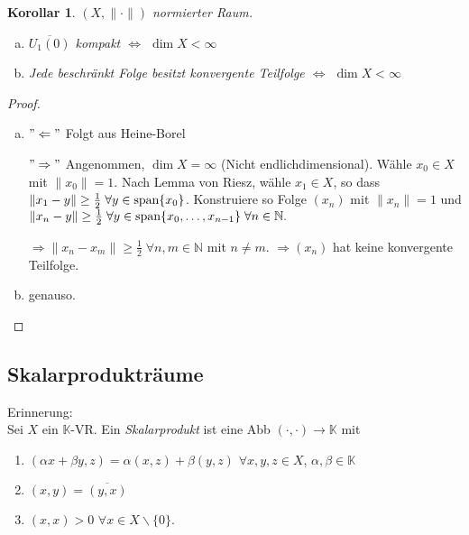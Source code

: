 \documentclass[ngerman]{report}
\theoremstyle{plain}%
\newtheorem{cor}[thm]{Korollar}
\theoremstyle{definition}%
\theoremstyle{myStyle}
\newcommand{\N}{\mathbb{N}}
\newcommand{\K}{\mathbb{K}}
\newcommand{\aufspan}{\textnormal{span}}
\newcommand{\norm}[1]{\|#1\|}
\newcommand{\df}[1][]{%
	\overset{#1}{\Rightarrow}
}
\newcommand{\aq}{\Leftrightarrow} %
\newcommand{\ov}[1]{\overline{#1}}
\begin{document}
	\begin{cor}
		$(X,\norm{\cdot})$ normierter Raum.
			\begin{enumerate}[a)] 
				\item $\overline{U_1(0)}$ kompakt $\aq$ $\dim X < \infty$
				\item Jede beschränkt Folge besitzt konvergente Teilfolge $\aq$ $\dim X < \infty$
			\end{enumerate}
	\end{cor}

	\begin{proof}
		 \begin{enumerate}[a)]
			 \item $"\Leftarrow"$ Folgt aus Heine-Borel\par
				$"\Rightarrow"$ Angenommen, $\dim X = \infty$ (Nicht endlichdimensional). 
				Wähle $x_0 \in X$ mit $\norm{x_0} = 1$. Nach Lemma von Riesz, wähle $x_1 \in X$, so dass 
				$\norm{x_1 - y} \geq \frac{1}{2} \; \forall y \in \aufspan\{x_0\}$. 
				Konstruiere so Folge $(x_n)$ mit $\norm{x_n} = 1$ und $\norm{x_n - y} \geq \frac{1}{2} \; \forall y\in \aufspan\{x_0,\dots,x_{n-1}\}\; \forall n\in\N.$ \par
				$\df \norm{x_n - x_m} \geq \frac{1}{2}\; \forall n,m \in \N$  mit $n \not = m$. 
				$\df (x_n)$ hat keine konvergente Teilfolge. \par
			\item genauso.
		\end{enumerate}
	\end{proof}
	\subsection{Skalarprodukträume}
Erinnerung:\\
	Sei $X$ ein $\K$-VR. Ein \textit{Skalarprodukt} ist eine Abb $(\cdot,\cdot) \to \K$ mit 
	\begin{enumerate}[(S1)]
		\item $(\alpha x + \beta y, z) = \alpha (x,z) + \beta (y,z)$ $\forall x,y,z \in X$, $\alpha,\beta \in \K$
		\item $(x,y) = \ov{(y,x)}$
		\item $(x,x) > 0$  $\forall x\in X\backslash\{0\}$.
	\end{enumerate}
\end{document}
